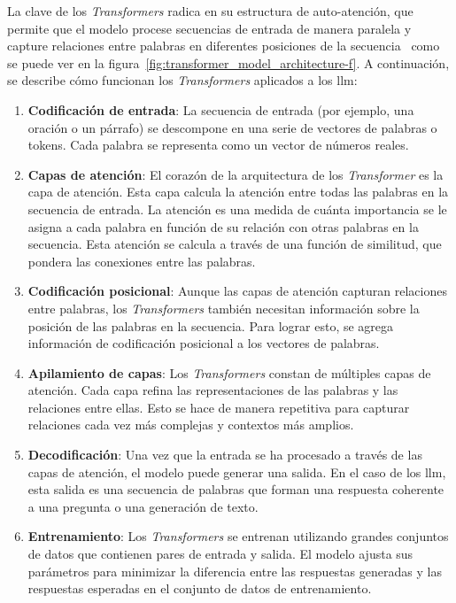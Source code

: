 La clave de los \textit{Transformers} radica en su estructura de auto-atención, que permite que el modelo procese secuencias de entrada de manera paralela y capture relaciones entre palabras en diferentes posiciones de la secuencia~\cite{Techtarget_LLM} como se puede ver en la figura~\ref{fig:transformer_model_architecture-f}. A continuación, se describe cómo funcionan los \textit{Transformers} aplicados a los \acrshort{llm}:

\begin{enumerate}
    
\item \textbf{Codificación de entrada}: La secuencia de entrada (por ejemplo, una oración o un párrafo) se descompone en una serie de vectores de palabras o tokens. Cada palabra se representa como un vector de números reales.

\item \textbf{Capas de atención}: El corazón de la arquitectura de los \textit{Transformer} es la capa de atención. Esta capa calcula la atención entre todas las palabras en la secuencia de entrada. La atención es una medida de cuánta importancia se le asigna a cada palabra en función de su relación con otras palabras en la secuencia. Esta atención se calcula a través de una función de similitud, que pondera las conexiones entre las palabras.

\item \textbf{Codificación posicional}: Aunque las capas de atención capturan relaciones entre palabras, los \textit{Transformers} también necesitan información sobre la posición de las palabras en la secuencia. Para lograr esto, se agrega información de codificación posicional a los vectores de palabras.

\item \textbf{Apilamiento de capas}: Los \textit{Transformers} constan de múltiples capas de atención. Cada capa refina las representaciones de las palabras y las relaciones entre ellas. Esto se hace de manera repetitiva para capturar relaciones cada vez más complejas y contextos más amplios.

\item \textbf{Decodificación}: Una vez que la entrada se ha procesado a través de las capas de atención, el modelo puede generar una salida. En el caso de los \acrshort{llm}, esta salida es una secuencia de palabras que forman una respuesta coherente a una pregunta o una generación de texto.

\item \textbf{Entrenamiento}: Los \textit{Transformers} se entrenan utilizando grandes conjuntos de datos que contienen pares de entrada y salida. El modelo ajusta sus parámetros para minimizar la diferencia entre las respuestas generadas y las respuestas esperadas en el conjunto de datos de entrenamiento.

\end{enumerate}

